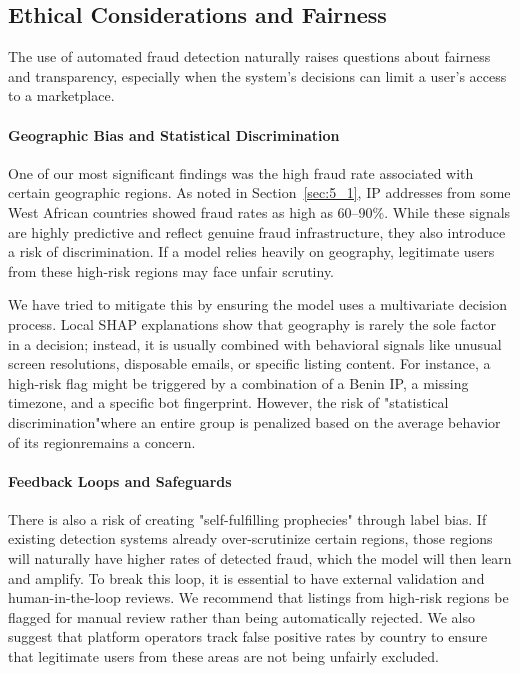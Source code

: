 \subsection{Ethical Considerations and Fairness}
\label{sec:5_10_2b}

The use of automated fraud detection naturally raises questions about fairness and transparency, especially when the system's decisions can limit a user's access to a marketplace.

\paragraph{Geographic Bias and Statistical Discrimination}

One of our most significant findings was the high fraud rate associated with certain geographic regions. As noted in Section~\ref{sec:5_1}, IP addresses from some West African countries showed fraud rates as high as 60–90\%. While these signals are highly predictive and reflect genuine fraud infrastructure, they also introduce a risk of discrimination. If a model relies heavily on geography, legitimate users from these high-risk regions may face unfair scrutiny.

We have tried to mitigate this by ensuring the model uses a multivariate decision process. Local SHAP explanations show that geography is rarely the sole factor in a decision; instead, it is usually combined with behavioral signals like unusual screen resolutions, disposable emails, or specific listing content. For instance, a high-risk flag might be triggered by a combination of a Benin IP, a missing timezone, and a specific bot fingerprint. However, the risk of "statistical discrimination"where an entire group is penalized based on the average behavior of its regionremains a concern.

\paragraph{Feedback Loops and Safeguards}

There is also a risk of creating "self-fulfilling prophecies" through label bias. If existing detection systems already over-scrutinize certain regions, those regions will naturally have higher rates of detected fraud, which the model will then learn and amplify. To break this loop, it is essential to have external validation and human-in-the-loop reviews. We recommend that listings from high-risk regions be flagged for manual review rather than being automatically rejected. We also suggest that platform operators track false positive rates by country to ensure that legitimate users from these areas are not being unfairly excluded.

